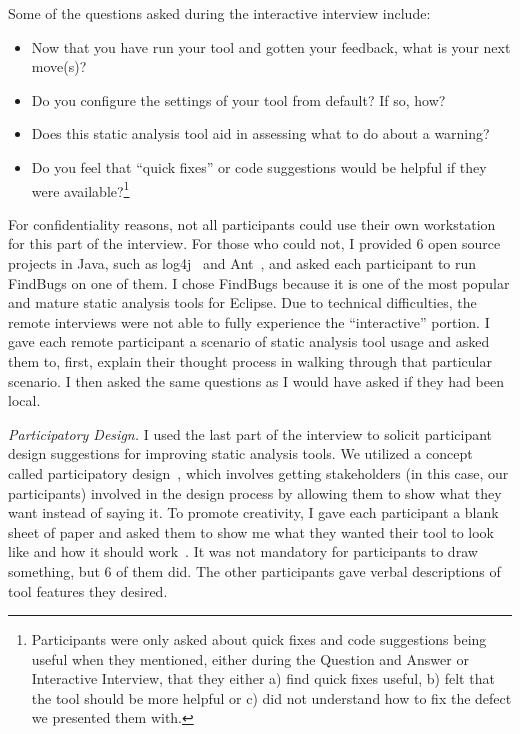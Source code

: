 \documentclass{llncs}
\begin{document}
Some of the questions asked during the interactive interview include:
\begin{itemize}
	\item Now that you have run your tool and gotten your feedback, what is your next move(s)?
	\item Do you configure the settings of your tool from default? If so, how?
	\item Does this static analysis tool aid in assessing what to do about a warning?
	\item Do you feel that ``quick fixes'' or code suggestions would be helpful if they were available?\footnote{Participants were only asked about quick fixes and code suggestions being useful when they mentioned, either during the Question and Answer or Interactive Interview, that they either a) find quick fixes useful, b) felt that the tool should be more helpful or c) did not understand how to fix the defect we presented them with. }
\end{itemize}

For confidentiality reasons, not all participants could use their own workstation for this part of the interview. For those who could not, I provided 6 open source projects in Java, such as log4j~\cite{log4j} and Ant~\cite{ANT}, and asked each participant to run FindBugs on one of them.  I chose FindBugs because it is one of the most popular and mature static analysis tools for Eclipse. Due to technical difficulties, the remote interviews were not able to fully experience the ``interactive'' portion. I gave each remote participant a scenario of static analysis tool usage and asked them to, first, explain their thought process in walking through that particular scenario. I then asked the same questions as I would have asked if they had been local.

\vspace{0.5em}
\noindent\textit{Participatory Design.}
I used the last part of the interview to solicit participant design suggestions for improving static analysis tools. We utilized a concept called participatory design~\cite{Spinuzzi:2005:Participatory}, which involves
getting stakeholders (in this case, our participants) involved in the design process by allowing them to show what they want instead of saying it. To promote creativity, I gave each participant a blank sheet of paper and asked them to show me what they wanted their tool to look like and how it should work~\cite{Johnson:2012:PreFFSAT}. It was not mandatory for participants to draw something, but 6 of them did. The other participants gave verbal descriptions of tool features they desired.
\end{document}
